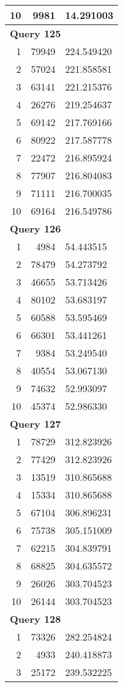 \begin{longtable}[{p}]{@{}rrp{}@{}}
10 & 9981 & 14.291003 \\
\midrule
\multicolumn{3}{l}{\bfseries Query 125} \\
1 & 79949 & 224.549420 \\
2 & 57024 & 221.858581 \\
3 & 63141 & 221.215376 \\
4 & 26276 & 219.254637 \\
5 & 69142 & 217.769166 \\
6 & 80922 & 217.587778 \\
7 & 22472 & 216.895924 \\
8 & 77907 & 216.804083 \\
9 & 71111 & 216.700035 \\
10 & 69164 & 216.549786 \\
\midrule
\multicolumn{3}{l}{\bfseries Query 126} \\
1 & 4984 & 54.443515 \\
2 & 78479 & 54.273792 \\
3 & 46655 & 53.713426 \\
4 & 80102 & 53.683197 \\
5 & 60588 & 53.595469 \\
6 & 66301 & 53.441261 \\
7 & 9384 & 53.249540 \\
8 & 40554 & 53.067130 \\
9 & 74632 & 52.993097 \\
10 & 45374 & 52.986330 \\
\midrule
\multicolumn{3}{l}{\bfseries Query 127} \\
1 & 78729 & 312.823926 \\
2 & 77429 & 312.823926 \\
3 & 13519 & 310.865688 \\
4 & 15334 & 310.865688 \\
5 & 67104 & 306.896231 \\
6 & 75738 & 305.151009 \\
7 & 62215 & 304.839791 \\
8 & 68825 & 304.635572 \\
9 & 26026 & 303.704523 \\
10 & 26144 & 303.704523 \\
\midrule
\multicolumn{3}{l}{\bfseries Query 128} \\
1 & 73326 & 282.254824 \\
2 & 4933 & 240.418873 \\
3 & 25172 & 239.532225 \\

\end{longtable}
